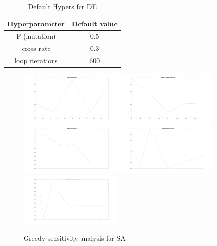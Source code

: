 \documentclass{IEEEtran}
\begin{document}
{{        \begin{table}[!hbp]
            \centering
            \begin{tabular}{|c|c|}
                \hline
                Hyperparameter & Default value \\
                \hline
                F (mutation) & 0.5 \\
                \hline
                cross rate & 0.3 \\
                \hline
                loop iterations & 600 \\
                \hline
            \end{tabular}
            \caption{Default Hypers for DE}
            \label{tab:hyper_DE_Q1}
        \end{table}

        \begin{figure}[!htbp]
            \centering
            \includegraphics[width=0.45\textwidth]{Q1/figures/eggholder_SA_metasearch_t0.png}
            \includegraphics[width=0.45\textwidth]{Q1/figures/eggholder_SA_metasearch_annealing_rate.png}
            \includegraphics[width=0.45\textwidth]{Q1/figures/eggholder_SA_metasearch_sd.png}
            \includegraphics[width=0.45\textwidth]{Q1/figures/eggholder_SA_metasearch_iterations.png}
            \includegraphics[width=0.45\textwidth]{Q1/figures/eggholder_SA_metasearch_max_count.png}
            \caption{Greedy sensitivity analysis for SA}
            \label{fig:sensitivity_SA}
        \end{figure}

}}
\end{document}
